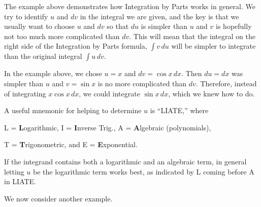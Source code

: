 The example above demonstrates how Integration by Parts works in general.  We try to identify $u$ and $dv$ in the integral we are given, and the key is that we usually want to choose $u$ and $dv$ so that $du$ is simpler than $u$ and $v$ is hopefully not too much more complicated than $dv$.  This will mean that the integral on the right side of the Integration by Parts formula, $\int v\,du$ will be simpler to integrate than the original integral $\int u\,dv$.

In the example above, we chose $u=x$ and $dv=\cos x\,dx$.  Then $du=dx$ was simpler than $u$ and $v=\sin x$ is no more complicated than $dv$.  Therefore, instead of integrating $x\cos x \,dx$, we could integrate $\sin x\,dx$, which we knew how to do.

A useful mnemonic for helping to determine $u$ is ``LIATE,'' where 
\begin{center}L = \textbf{L}ogarithmic, I = \textbf{I}nverse Trig., A = \textbf{A}lgebraic (polynomials), 

T = \textbf{T}rigonometric, and E = \textbf{E}xponential.
\end{center}

If the integrand contains both a logarithmic and an algebraic term, in general letting $u$ be the logarithmic term works best, as indicated by L coming before A in LIATE.

We now consider another example.\\


